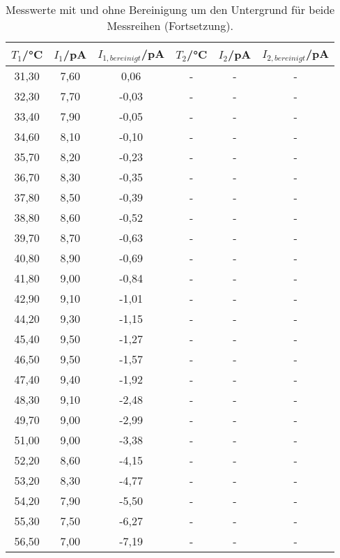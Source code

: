 \begin{table}[htp]
	\begin{center}
    \caption{Messwerte mit und ohne Bereinigung um den Untergrund für beide Messreihen (Fortsetzung).}
    \label{tab:messwerte3}
		\begin{tabular}{cccccc}
		\toprule
			{$T_1$/°C} & {$I_1$/pA} & {$I_{1,bereinigt}$/pA} & {$T_2$/°C} & {$I_2$/pA} & {$I_{2,bereinigt}$/pA}\\
			\midrule
			31,30 & 7,60 & 0,06 & - & - & -\\
			32,30 & 7,70 & -0,03 & - & - & -\\
			33,40 & 7,90 & -0,05 & - & - & -\\
			34,60 & 8,10 & -0,10 & - & - & -\\
			35,70 & 8,20 & -0,23 & - & - & -\\
			36,70 & 8,30 & -0,35 & - & - & -\\
			37,80 & 8,50 & -0,39 & - & - & -\\
			38,80 & 8,60 & -0,52 & - & - & -\\
			39,70 & 8,70 & -0,63 & - & - & -\\
			40,80 & 8,90 & -0,69 & - & - & -\\
			41,80 & 9,00 & -0,84 & - & - & -\\
			42,90 & 9,10 & -1,01 & - & - & -\\
			44,20 & 9,30 & -1,15 & - & - & -\\
			45,40 & 9,50 & -1,27 & - & - & -\\
			46,50 & 9,50 & -1,57 & - & - & -\\
			47,40 & 9,40 & -1,92 & - & - & -\\
			48,30 & 9,10 & -2,48 & - & - & -\\
			49,70 & 9,00 & -2,99 & - & - & -\\
			51,00 & 9,00 & -3,38 & - & - & -\\
			52,20 & 8,60 & -4,15 & - & - & -\\
			53,20 & 8,30 & -4,77 & - & - & -\\
			54,20 & 7,90 & -5,50 & - & - & -\\
			55,30 & 7,50 & -6,27 & - & - & -\\
			56,50 & 7,00 & -7,19 & - & - & -\\
		\bottomrule
		\end{tabular}
	\end{center}
\end{table}

\newpage
